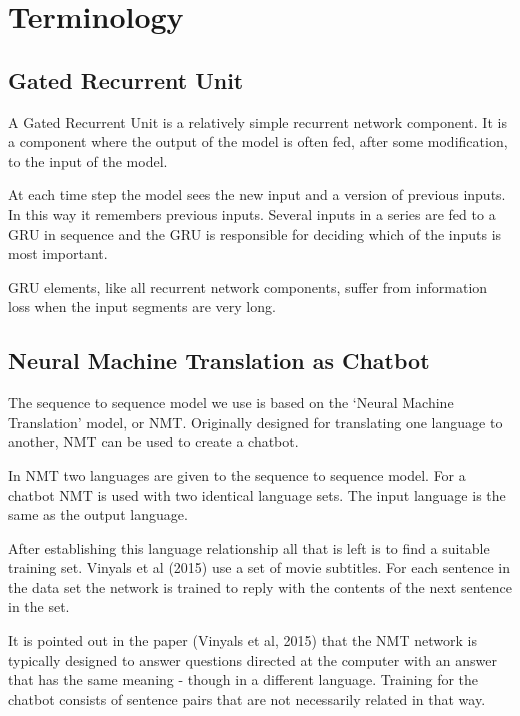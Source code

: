 \chapter{Terminology}

\section{Gated Recurrent Unit}

A Gated Recurrent Unit is a relatively simple recurrent network component. It is a component where the output of the model is often fed, after some modification, to the input of the model. 

At each time step the model sees the new input and a version of previous inputs. In this way it remembers previous inputs. Several inputs in a series are fed to a GRU in sequence and the GRU is responsible for deciding which of the inputs is most important.

GRU elements, like all recurrent network components, suffer from information loss when the input segments are very long.

\section{Neural Machine Translation as Chatbot}

The sequence to sequence model we use is based on the \textquoteleft Neural Machine Translation\textquoteright{} model, or \ac{NMT}. Originally designed for translating one language to another, NMT can be used to create a chatbot.

In NMT two languages are given to the sequence to sequence model. For a chatbot NMT is used with two identical language sets. The input language is the same as the output language.

After establishing this language relationship all that is left is to find a suitable training set. Vinyals et al (2015)\cite{DBLP:journals/corr/VinyalsL15} use a set of movie subtitles. For each sentence in the data set the network is trained to reply with the contents of the next sentence in the set.

It is pointed out in the paper (Vinyals et al, 2015)\cite{DBLP:journals/corr/VinyalsL15} that the NMT network is typically designed to answer questions directed at the computer with an answer that has the same meaning - though in a different language. Training for the chatbot consists of sentence pairs that are not necessarily related in that way. 

